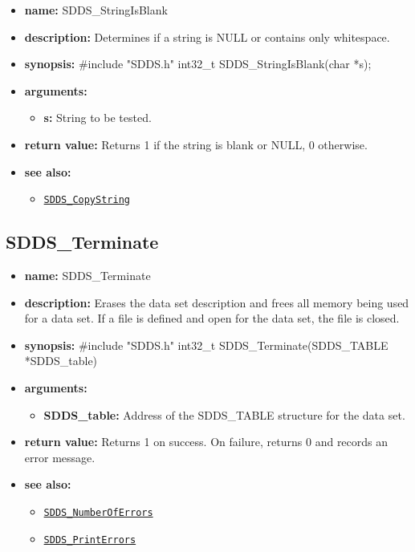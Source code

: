 \documentclass[11pt]{article}
\newcommand{\progref}[1]{\hyperref[SDDS_#1]{\tt SDDS\_#1}}
\begin{document}
\begin{itemize}
\item {\bf name:}\newline
SDDS\_StringIsBlank
\item {\bf description:}\newline
Determines if a string is NULL or contains only whitespace.
\item {\bf synopsis:} \#include "SDDS.h"\newline
int32\_t SDDS\_StringIsBlank(char *s);
\item {\bf arguments:}
\begin{itemize}
\item {\bf s:} String to be tested.
\end{itemize}
\item {\bf return value:}\newline
Returns 1 if the string is blank or NULL, 0 otherwise.
\item {\bf see also:}
\begin{itemize}
\item \progref{CopyString}
\end{itemize}
\end{itemize}

\subsection{SDDS\_Terminate}
\label{SDDS_Terminate}

\begin{itemize}
\item {\bf name:}\newline
SDDS\_Terminate
\item {\bf description:}\newline
Erases the data set description and frees all memory being used for a data set. If a file is defined and open for the data set, the file is closed.
\item {\bf synopsis:} \#include "SDDS.h"\newline
int32\_t SDDS\_Terminate(SDDS\_TABLE *SDDS\_table)
\item {\bf arguments:}
\begin{itemize}
\item {\bf SDDS\_table:} Address of the SDDS\_TABLE structure for the data set.
\end{itemize}
\item {\bf return value:}\newline
Returns 1 on success. On failure, returns 0 and records an error message.
\item {\bf see also:}
\begin{itemize}
\item \progref{NumberOfErrors}
\item \progref{PrintErrors}
\end{itemize}
\end{itemize}
\end{document}
